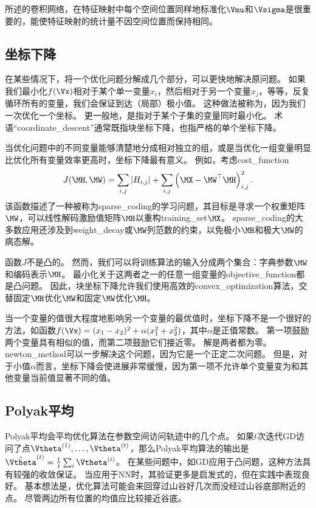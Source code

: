 所述的卷积网络，在特征映射中每个空间位置同样地标准化$\Vmu$和$\Vsigma$是很重要的，能使特征映射的统计量不因空间位置而保持相同。

\subsection{坐标下降}
\label{sec:coordinate_descent}
在某些情况下，将一个优化问题分解成几个部分，可以更快地解决原问题。
如果我们最小化$f(\Vx)$相对于某个单一变量$x_i$，然后相对于另一个变量$x_j$，等等，反复循环所有的变量，我们会保证到达（局部）极小值。
这种做法被称为，因为我们一次优化一个坐标。
更一般地，是指对于某个子集的变量同时最小化。
术语``\gls{coordinate_descent}''通常既指块坐标下降，也指严格的单个坐标下降。


当优化问题中的不同变量能够清楚地分成相对独立的组，或是当优化一组变量明显比优化所有变量效率更高时，坐标下降最有意义。
例如，考虑\gls{cost_function}
\begin{equation}
    J(\MH, \MW) = \sum_{i,j} |H_{i,j}| + \sum_{i,j} \left( \MX - \MW^\top \MH \right)_{i,j}^2 .
\end{equation}
该函数描述了一种被称为\gls{sparse_coding}的学习问题，其目标是寻求一个权重矩阵$\MW$，可以线性解码激励值矩阵$\MH$以重构\gls{training_set}$\MX$。
\gls{sparse_coding}的大多数应用还涉及到\gls{weight_decay}或$\MW$列范数的约束，以免极小$\MH$和极大$\MW$的病态解。

函数$J$不是凸的。
然而，我们可以将训练算法的输入分成两个集合：字典参数$\MW$和编码表示$\MH$。
最小化关于这两者之一的任意一组变量的\gls{objective_function}都是凸问题。
因此，块坐标下降允许我们使用高效的\gls{convex_optimization}算法，交替固定$\MH$优化$\MW$和固定$\MW$优化$\MH$。

当一个变量的值很大程度地影响另一个变量的最优值时，坐标下降不是一个很好的方法，如函数$f(\Vx)=(x_1 - x_2)^2+\alpha(x_1^2 + x_2^2)$，其中$\alpha$是正值常数。
第一项鼓励两个变量具有相似的值，而第二项鼓励它们接近零。
解是两者都为零。
\gls{newton_method}可以一步解决这个问题，因为它是一个正定二次问题。
但是，对于小值$\alpha$而言，坐标下降会使进展非常缓慢，因为第一项不允许单个变量变为和其他变量当前值显著不同的值。


\subsection{Polyak平均}
\label{sec:polyak_averaging}
Polyak平均\citep{Polyak+Juditsky-1992}会平均优化算法在参数空间访问轨迹中的几个点。
如果$t$次迭代\gls{GD}访问了点$\Vtheta^{(1)},\dots,\Vtheta^{(t)}$，那么Polyak平均算法的输出是$\hat{\Vtheta}^{(t)} = \frac{1}{t} \sum_i \Vtheta^{(i)}$。
在某些问题中，如\gls{GD}应用于凸问题，这种方法具有较强的收敛保证。
当应用于\gls{NN}时，其验证更多是启发式的，但在实践中表现良好。
基本想法是，优化算法可能会来回穿过山谷好几次而没经过山谷底部附近的点。
尽管两边所有位置的均值应比较接近谷底。


